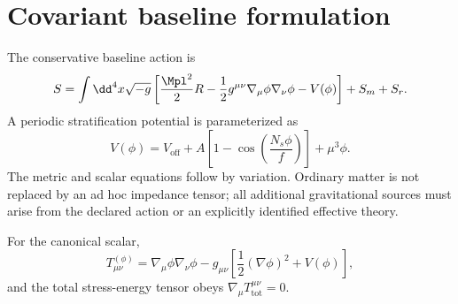 \section{Covariant baseline formulation}
\label{sec:covariant}

The conservative baseline action is
\begin{equation}
S = \int \dd^4x\sqrt{-g}\left[\frac{\Mpl^2}{2}R
-\frac{1}{2}g^{\mu\nu}\nabla_\mu\phi\nabla_\nu\phi
-V(\phi)\right]+S_m+S_r.
\end{equation}
A periodic stratification potential is parameterized as
\begin{equation}
V(\phi)=V_{\mathrm{off}}+A\left[1-\cos\left(\frac{N_s\phi}{f}\right)\right]+\mu^3\phi.
\end{equation}
The metric and scalar equations follow by variation. Ordinary matter is not replaced by an ad hoc impedance tensor; all additional gravitational sources must arise from the declared action or an explicitly identified effective theory.

For the canonical scalar,
\begin{equation}
T^{(\phi)}_{\mu\nu}=\nabla_\mu\phi\nabla_\nu\phi-g_{\mu\nu}\left[\frac12(\nabla\phi)^2+V(\phi)\right],
\end{equation}
and the total stress-energy tensor obeys $\nabla_\mu T^{\mu\nu}_{\mathrm{tot}}=0$.
